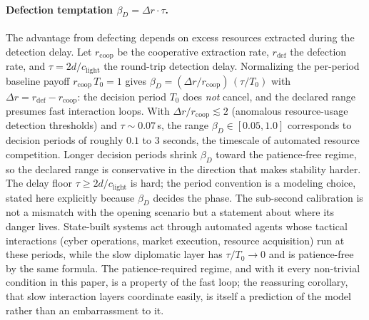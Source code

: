 \documentclass[manuscript,screen,review]{jair}
\begin{document}
\paragraph{Defection temptation $\beta_D = \Delta r \cdot \tau$.}
The advantage from defecting depends on excess resources extracted during the detection delay. Let $r_{\mathrm{coop}}$ be the cooperative extraction rate, $r_{\mathrm{def}}$ the defection rate, and $\tau = 2d/c_{\mathrm{light}}$ the round-trip detection delay. Normalizing the per-period baseline payoff $r_{\mathrm{coop}}\,T_0 = 1$ gives $\beta_D = (\Delta r/r_{\mathrm{coop}})\,(\tau/T_0)$ with $\Delta r = r_{\mathrm{def}}-r_{\mathrm{coop}}$: the decision period $T_0$ does \emph{not} cancel, and the declared range presumes fast interaction loops. With $\Delta r/r_{\mathrm{coop}} \lesssim 2$ (anomalous resource-usage detection thresholds) and $\tau \sim 0.07$\,s, the range $\beta_D \in [0.05, 1.0]$ corresponds to decision periods of roughly $0.1$ to $3$ seconds, the timescale of automated resource competition. Longer decision periods shrink $\beta_D$ toward the patience-free regime, so the declared range is conservative in the direction that makes stability harder. The delay floor $\tau \geq 2d/c_{\mathrm{light}}$ is hard; the period convention is a modeling choice, stated here explicitly because $\beta_D$ decides the phase. The sub-second calibration is not a mismatch with the opening scenario but a statement about where its danger lives. State-built systems act through automated agents whose tactical interactions (cyber operations, market execution, resource acquisition) run at these periods, while the slow diplomatic layer has $\tau/T_0 \to 0$ and is patience-free by the same formula. The patience-required regime, and with it every non-trivial condition in this paper, is a property of the fast loop; the reassuring corollary, that slow interaction layers coordinate easily, is itself a prediction of the model rather than an embarrassment to it.
\end{document}
